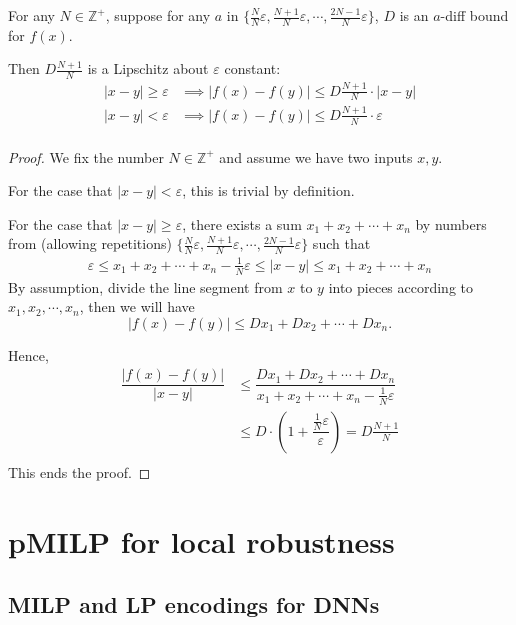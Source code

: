 \documentclass{llncs}
\begin{document}
	
	\begin{proposition}
		For any $N\in\mathbb{Z}^+$, suppose for any $a$ in $\{\frac{N}{N}\varepsilon,\frac{N+1}{N}\varepsilon,\cdots, \frac{2N-1}{N}\varepsilon\}$, $D$ is an $a$-diff bound for $f(x)$. 
		
		Then $D\frac{N+1}{N}$ is a Lipschitz about $\varepsilon$ constant:\begin{align*}
			|x-y|\geq \varepsilon &\implies |f(x)-f(y)| \leq D\frac{N+1}{N} \cdot |x-y|\\
			|x-y|<\varepsilon &\implies |f(x)-f(y)| \leq D\frac{N+1}{N} \cdot \varepsilon\\
		\end{align*}
	\end{proposition}
	\begin{proof}
		We fix the number $N\in\mathbb{Z}^+$ and assume we have two inputs $x, y$.
		
		For the case that $|x-y|<\varepsilon$, this is trivial by definition.
		
		For the case that $|x-y|\geq \varepsilon$, there exists a sum $x_1+x_2+\cdots+x_n$ by numbers from (allowing repetitions) $\{\frac{N}{N}\varepsilon,\frac{N+1}{N}\varepsilon,\cdots, \frac{2N-1}{N}\varepsilon\}$ such that \begin{align*}
			\varepsilon \leq x_1+x_2+\cdots+x_n -\frac{1}{N}\varepsilon \leq |x-y| \leq x_1+x_2+\cdots+x_n
		\end{align*}
		By assumption, divide the line segment from $x$ to $y$ into pieces according to $x_1, x_2,\cdots,x_n$, then we will have $$|f(x)-f(y)|\leq Dx_1+Dx_2+\cdots+Dx_n.$$
		
			Hence,\begin{align*}
			\dfrac{|f(x)-f(y)|}{|x-y|} &\leq \dfrac{Dx_1+Dx_2+\cdots+Dx_n}{x_1+x_2+\cdots+x_n -\frac{1}{N}\varepsilon}\\
			& \leq D\cdot( 1+  \dfrac{\frac{1}{N}\varepsilon}{\varepsilon})= D \frac{N+1}{N}\\
		\end{align*}
		This ends the proof.
	\end{proof}
	
	
	
	\section{pMILP for local robustness}
	
	
	
	\subsection{MILP and LP encodings for DNNs}
	
\end{document}
